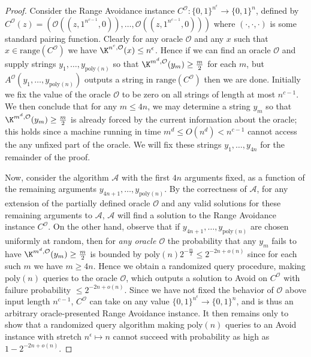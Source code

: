 \documentclass[11pt]{article}
\newcommand{\B}{\{0,1\}}
\renewcommand{\poly}{\mathrm{poly}}
\begin{document}
\begin{proof}
Consider the Range Avoidance instance $C^{\mathcal{O}}: \B^{n^\epsilon} \to \B^n$, defined by $C^{\mathcal{O}}(z) = (\mathcal{O}((z,1^{n^{c-1}},0)),\ldots, \mathcal{O}((z,1^{n^{c-1}},0)))$ where $(\cdot,\cdot,\cdot)$ is some standard pairing function. Clearly for any oracle $\mathcal{O}$ and any $x$ such that $x \in \mathrm{range}(C^\mathcal{O})$ we have $\K^{n^c, \mathcal{O}}(x) \leq n^\epsilon$. Hence if we can find an oracle $\mathcal{O}$ and supply strings $y_1,\ldots,y_{\poly(n)}$ so that $\K^{m^d, \mathcal{O}}(y_m) \geq \frac{m}{2}$ for each $m$, but $A^{\mathcal{O}}(y_1,\ldots,y_{\poly(n)})$ outputs a string in $\mathrm{range}(C^{\mathcal{O}})$ then we are done. Initially we fix the value of the oracle $\mathcal{O}$ to be zero on all strings of length at most $n^{c-1}$. We then conclude that for any $m \leq 4n$, we may determine a string $y_m$ so that $\K^{m^d, \mathcal{O}}(y_m) \geq \frac{m}{2}$ is already forced by the current information about the oracle; this holds since a machine running in time $m^d \leq O(n^d) < n^{c-1}$ cannot access the any unfixed part of the oracle. We will fix these strings $y_1,\ldots,y_{4n}$ for the remainder of the proof.

Now, consider the algorithm $\mathcal{A}$ with the first $4n$ arguments fixed, as a function of the remaining arguments $y_{4n+1},\ldots,y_{\poly(n)}$. By the correctness of $\mathcal{A}$, for any extension of the partially defined oracle $\mathcal{O}$ and any valid solutions for these remaining arguments to $\mathcal{A}$, $\mathcal{A}$ will find a solution to the Range Avoidance instance $C^{\mathcal{O}}$. On the other hand, observe that if $y_{4n+1},\ldots,y_{\poly(n)}$ are chosen uniformly at random, then for \emph{any oracle $\mathcal{O}$} the probability that any $y_m$ fails to have $\K^{m^d, \mathcal{O}}(y_m) \geq \frac{m}{2}$ is bounded by $\poly(n) 2^{-\frac{m}{2}} \leq 2^{ -2n + o(n)}$ since for each such $m$ we have $m \geq 4n$. Hence we obtain a randomized query procedure, making $\poly(n)$ queries to the oracle $\mathcal{O}$, which outputs a solution to Avoid on $C^{\mathcal{O}}$ with failure probability $\leq 2^{-2n + o(n)}$. Since we have not fixed the behavior of $\mathcal{O}$ above input length $n^{c-1}$, $C^{\mathcal{O}}$ can take on any value $\B^{n^\epsilon} \to \B^n$, and is thus an arbitrary oracle-presented Range Avoidance instance. It then remains only to show that a randomized query algorithm making $\poly(n)$ queries to an Avoid instance with stretch $n^{\epsilon} \mapsto n$ cannot succeed with probability as high as $1- 2^{-2n + o(n)}$.


\end{proof}
\end{document}
